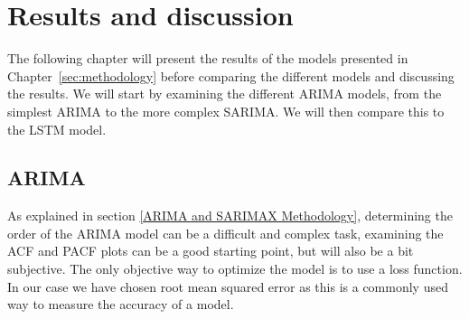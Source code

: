 \section{Results and discussion}\label{sec:results}
The following chapter will present the results of the models presented in Chapter~\ref{sec:methodology} before comparing the different models and discussing the results. We will start by examining the different ARIMA models, from the simplest ARIMA to the more complex SARIMA. We will then compare this to the LSTM model. 

\subsection{ARIMA}\label{sec:arima}
As explained in section \ref{ARIMA and SARIMAX Methodology}, determining the order of the ARIMA model can be a difficult and complex task, examining the ACF and PACF plots can be a good starting point, but will also be a bit subjective. The only objective way to optimize the model is to use a loss function. In our case we have chosen root mean squared error as this is a commonly used way to measure the accuracy of a model.

